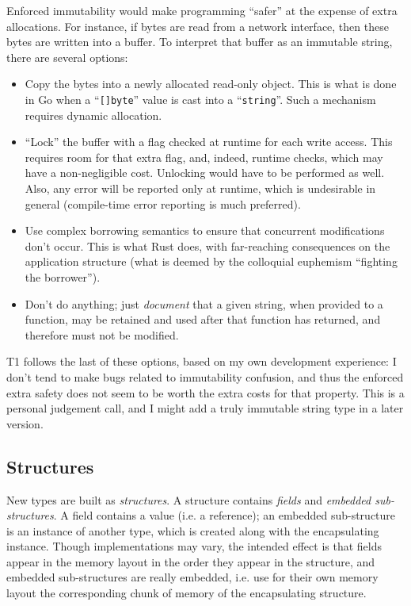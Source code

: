 \begin{rationale}
Enforced immutability would make programming ``safer'' at the expense
of extra allocations. For instance, if bytes are read from a network
interface, then these bytes are written into a buffer. To interpret that
buffer as an immutable string, there are several options:
\begin{itemize}

    \item Copy the bytes into a newly allocated read-only object. This
    is what is done in Go when a ``\verb|[]byte|'' value is cast into
    a ``\verb|string|''. Such a mechanism requires dynamic allocation.

    \item ``Lock'' the buffer with a flag checked at runtime for each
    write access. This requires room for that extra flag, and, indeed,
    runtime checks, which may have a non-negligible cost. Unlocking
    would have to be performed as well. Also, any error will be reported
    only at runtime, which is undesirable in general (compile-time error
    reporting is much preferred).

    \item Use complex borrowing semantics to ensure that concurrent
    modifications don't occur. This is what Rust does, with far-reaching
    consequences on the application structure (what is deemed by the
    colloquial euphemism ``fighting the borrower'').

    \item Don't do anything; just \emph{document} that a given string,
    when provided to a function, may be retained and used after that
    function has returned, and therefore must not be modified.

\end{itemize}
T1 follows the last of these options, based on my own development
experience: I don't tend to make bugs related to immutability confusion,
and thus the enforced extra safety does not seem to be worth the extra
costs for that property. This is a personal judgement call, and I
might add a truly immutable string type in a later version.
\end{rationale}

\subsection{Structures}

New types are built as \emph{structures}. A structure contains
\emph{fields} and \emph{embedded sub-structures}. A field contains a
value (i.e. a reference); an embedded sub-structure is an instance of
another type, which is created along with the encapsulating instance.
Though implementations may vary, the intended effect is that fields
appear in the memory layout in the order they appear in the structure,
and embedded sub-structures are really embedded, i.e. use for their own
memory layout the corresponding chunk of memory of the encapsulating
structure.


